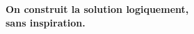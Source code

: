 \documentclass[preview]{standalone}
\begin{document}
\begin{center}
\textbf{On construit la solution logiquement,\\sans inspiration.}
\end{center}
\end{document}
